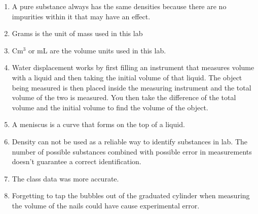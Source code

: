\documentclass{article}
\begin{document}
\begin{enumerate}
\item A pure substance always has the same densities because there are no impurities within it that may have an effect.
\item Grams is the unit of mass used in this lab
\item Cm$^3$ or mL are the volume units used in this lab. 
\item Water displacement works by first filling an instrument that measures volume with a liquid and then taking the initial volume of that liquid. The object being measured is then placed inside the measuring instrument and the total volume of the two is measured. You then take the difference of the total volume and the initial volume to find the volume of the object.
\item A meniscus is a curve that forms on the top of a liquid.
\item Density can not be used as a reliable way to identify substances in lab. The number of possible substances combined with possible error in measurements doesn't guarantee a correct identification.
\item The class data was more accurate.
\item Forgetting to tap the bubbles out of the graduated cylinder when measuring the volume of the nails could have cause experimental error.
\end{enumerate}
\end{document}
